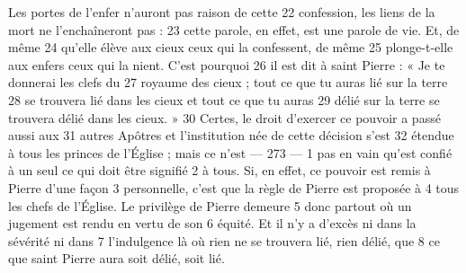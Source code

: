 Les portes de l'enfer n'auront pas raison de cette	 
22	 	confession, les liens de la mort ne l'enchaîneront pas :	 
23	 	cette parole, en effet, est une parole de vie. Et, de même	 
24	 	qu'elle élève aux cieux ceux qui la confessent, de même	 
25	 	plonge-t-elle aux enfers ceux qui la nient. C'est pourquoi	 
26	 	il est dit à saint Pierre : « Je te donnerai les clefs du	 
27	 	royaume des cieux ; tout ce que tu auras lié sur la terre	 
28	 	se trouvera lié dans les cieux et tout ce que tu auras	 
29	 	délié sur la terre se trouvera délié dans les cieux. »	 
30	 	Certes, le droit d'exercer ce pouvoir a passé aussi aux	 
31	 	autres Apôtres et l'institution née de cette décision s'est	 
32	 	étendue à tous les princes de l'Église ; mais ce n'est	 
 	--- 273 ---	 
1	 	pas en vain qu'est confié à un seul ce qui doit être signifié	 
2	 	à tous. Si, en effet, ce pouvoir est remis à Pierre d'une façon	 
3	 	personnelle, c'est que la règle de Pierre est proposée à	 
4	 	tous les chefs de l'Église. Le privilège de Pierre demeure	 
5	 	donc partout où un jugement est rendu en vertu de son	 
6	 	équité. Et il n'y a d'excès ni dans la sévérité ni dans	 
7	 	l'indulgence là où rien ne se trouvera lié, rien délié, que	 
8	 	ce que saint Pierre aura soit délié, soit lié.